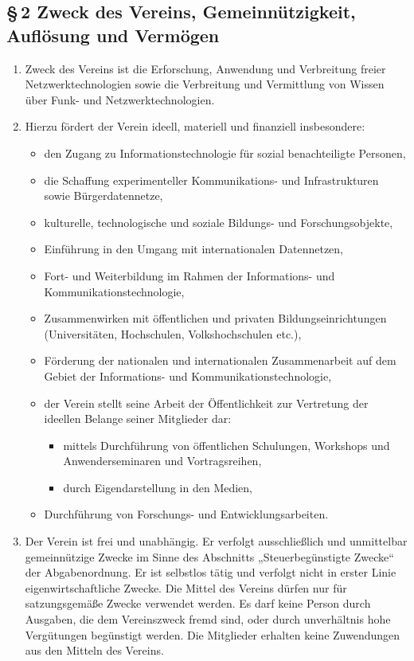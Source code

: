 \documentclass[12pt,a4paper]{article}
\begin{document}
\subsection*{§\,2 Zweck des Vereins, Gemeinnützigkeit, Auflösung und Vermögen}
\begin{enumerate}
\item Zweck des Vereins ist die Erforschung, Anwendung und Verbreitung freier Netzwerktechnologien sowie die Verbreitung und Vermittlung von Wissen über Funk- und Netzwerktechnologien.
\item Hierzu fördert der Verein ideell, materiell und finanziell insbesondere:
\begin{itemize}
\item den Zugang zu Informationstechnologie für sozial benachteiligte Personen,
\item die Schaffung experimenteller Kommunikations- und Infrastrukturen sowie Bürgerdatennetze,
\item kulturelle, technologische und soziale Bildungs- und Forschungsobjekte,
\item Einführung in den Umgang mit internationalen Datennetzen,
\item Fort- und Weiterbildung im Rahmen der Informations- und Kommunikationstechnologie,
\item Zusammenwirken mit öffentlichen und privaten Bildungseinrichtungen (Universitäten, Hochschulen, Volkshochschulen etc.),
\item Förderung der nationalen und internationalen Zusammenarbeit auf dem Gebiet der Informations- und Kommunikationstechnologie,
\item der Verein stellt seine Arbeit der Öffentlichkeit zur Vertretung der ideellen Belange seiner Mitglieder dar:
\begin{itemize}
\item mittels Durchführung von öffentlichen Schulungen, Workshops und Anwenderseminaren und Vortragsreihen,
\item durch Eigendarstellung in den Medien,
\end{itemize}
\item Durchführung von Forschungs- und Entwicklungsarbeiten.
\end{itemize}
\item Der Verein ist frei und unabhängig. Er verfolgt ausschließlich und unmittelbar gemeinnützige Zwecke im Sinne des Abschnitts „Steuerbegünstigte Zwecke“ der Abgabenordnung. Er ist selbstlos tätig und verfolgt nicht in erster Linie eigenwirtschaftliche Zwecke. Die Mittel des Vereins dürfen nur für satzungsgemäße Zwecke verwendet werden. Es darf keine Person durch Ausgaben, die dem Vereinszweck fremd sind, oder durch unverhältnis hohe Vergütungen begünstigt werden. Die Mitglieder erhalten keine Zuwendungen aus den Mitteln des Vereins.

\end{enumerate}
\end{document}
